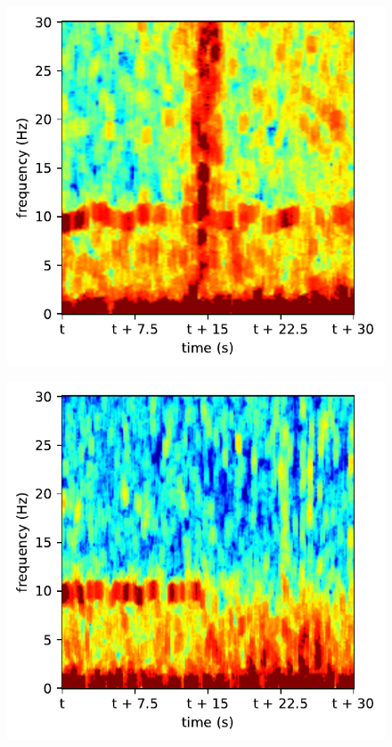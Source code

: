 \begin{subfigure}{.16\textwidth}
  \centering
  \includegraphics[width=1\linewidth]{./pics/class_clean_0}
  \caption{}
  \label{fig_1_11}
\end{subfigure}%
\begin{subfigure}{.16\textwidth}
  \centering
  \includegraphics[width=1\linewidth]{./pics/class_clean_1}
  \caption{}
  \label{fig_1_12}
\end{subfigure}%
